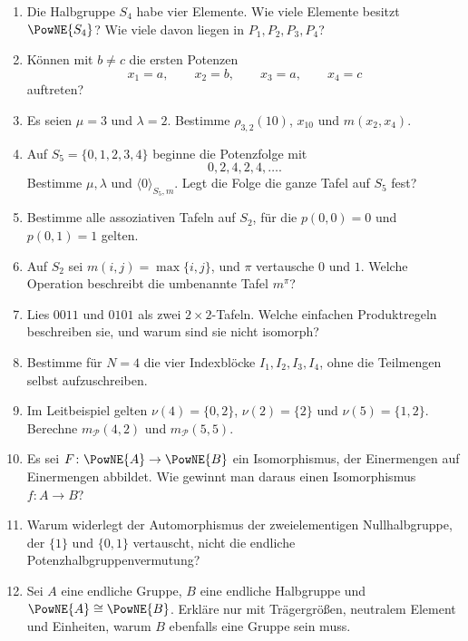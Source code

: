 \documentclass[main.tex]{subfiles}
\begin{document}
\begin{enumerate}
  \item Die Halbgruppe \(S_4\) habe vier Elemente.  Wie viele Elemente besitzt
    \(\PowNE{S_4}\)?  Wie viele davon liegen in \(P_1,P_2,P_3,P_4\)?

  \item Können mit \(b\neq c\) die ersten Potenzen
    \[
      x_1=a,\qquad x_2=b,\qquad x_3=a,\qquad x_4=c
    \]
    auftreten?

  \item Es seien \(\mu=3\) und \(\lambda=2\).  Bestimme
    \(\rho_{3,2}(10)\), \(x_{10}\) und \(m(x_2,x_4)\).

  \item Auf \(S_5=\{0,1,2,3,4\}\) beginne die Potenzfolge mit
    \[
      0,2,4,2,4,\ldots.
    \]
    Bestimme \(\mu,\lambda\) und \(\langle0\rangle_{S_5,m}\).  Legt die Folge die
    ganze Tafel auf \(S_5\) fest?

  \item Bestimme alle assoziativen Tafeln auf \(S_2\), für die
    \(p(0,0)=0\) und \(p(0,1)=1\) gelten.

  \item Auf \(S_2\) sei \(m(i,j)=\max\{i,j\}\), und \(\pi\) vertausche
    \(0\) und \(1\).  Welche Operation beschreibt die umbenannte Tafel
    \(m^\pi\)?

  \item Lies \(0011\) und \(0101\) als zwei \(2\times2\)-Tafeln.  Welche
    einfachen Produktregeln beschreiben sie, und warum sind sie nicht
    isomorph?

  \item Bestimme für \(N=4\) die vier Indexblöcke
    \(I_1,I_2,I_3,I_4\), ohne die Teilmengen selbst aufzuschreiben.

  \item Im Leitbeispiel gelten
    \(\nu(4)=\{0,2\}\), \(\nu(2)=\{2\}\) und
    \(\nu(5)=\{1,2\}\).  Berechne \(m_{\mathcal P}(4,2)\) und
    \(m_{\mathcal P}(5,5)\).

  \item Es sei \(F\colon\PowNE{A}\to\PowNE{B}\) ein Isomorphismus, der
    Einermengen auf Einermengen abbildet.  Wie gewinnt man daraus einen
    Isomorphismus \(f\colon A\to B\)?

  \item Warum widerlegt der Automorphismus der zweielementigen
    Nullhalbgruppe, der \(\{1\}\) und \(\{0,1\}\) vertauscht, nicht die
    endliche Potenzhalbgruppenvermutung?

  \item Sei \(A\) eine endliche Gruppe, \(B\) eine endliche Halbgruppe und
    \(\PowNE{A}\cong\PowNE{B}\).  Erkläre nur mit Trägergrößen, neutralem
    Element und Einheiten, warum \(B\) ebenfalls eine Gruppe sein muss.
\end{enumerate}
\end{document}
